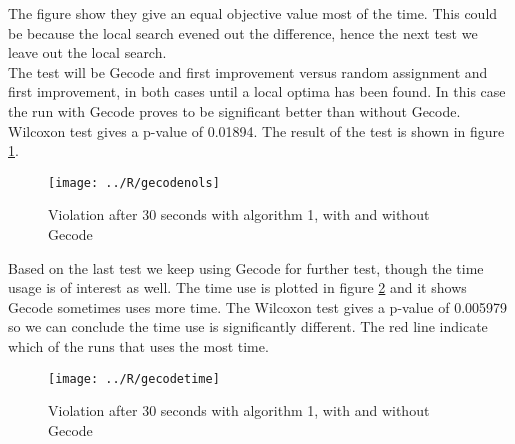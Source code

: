 The figure show they give an equal objective value most of the time. This could be because the local search 
evened out the difference, hence the next test we leave out the local search. \medskip \\
The test will be Gecode and first improvement versus random assignment and first improvement, in both cases until a 
local optima has been found. In this case the run with Gecode proves to be significant better than without Gecode. 
Wilcoxon test gives a p-value of 0.01894. The result of the test is shown in figure \ref{fig_gecodenols}. \\ 
\begin{figure}[!h]
\centering
\texttt{[image: ../R/gecodenols]} \caption{Violation after 30 seconds with 
algorithm 1, with and without Gecode}\label{fig_gecodenols}
\end{figure}\noindent
Based on the last test we keep using Gecode for further test, though the time usage is of interest as well. The time 
use is plotted in figure \ref{fig_gecodetime} and it shows Gecode sometimes uses more time. The Wilcoxon test gives a 
p-value of 0.005979 so we can conclude the time use is significantly different. The red line indicate which of the runs 
that uses the most time. 
\begin{figure}[!h]
\centering
\texttt{[image: ../R/gecodetime]} \caption{Violation after 30 seconds with 
algorithm 1, with and without Gecode}\label{fig_gecodetime}
\end{figure}\noindent
\newpage
\phantom{p. 2}
\clearpage
